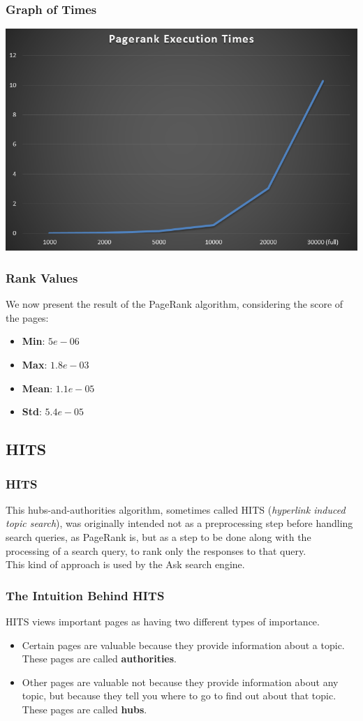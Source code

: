 \documentclass{beamer}
\begin{document}
\begin{frame}
\frametitle{Graph of Times}
\includegraphics[scale=0.5]{img/Ranking/Pagerank.PNG} 
\end{frame}

\begin{frame}
\frametitle{Rank Values}
We now present the result of the PageRank algorithm, considering the score of the pages:\\
\begin{itemize}
\item \textbf{Min}: $5e-06$
\item \textbf{Max}: $1.8e-03$
\item \textbf{Mean}: $1.1e-05$
\item \textbf{Std}: $5.4e-05$
\end{itemize}
\end{frame}

\subsection{HITS}
\begin{frame}
\frametitle{HITS}
This hubs-and-authorities algorithm, sometimes called HITS (\textit{hyperlink induced
topic search}), was originally intended not as a preprocessing step before
handling search queries, as PageRank is, but as a step to be done along with
the processing of a search query, to rank only the responses to that query.\\
\medskip
This kind of approach is  used by the Ask search engine.
\end{frame}

\begin{frame}
\frametitle{The Intuition Behind HITS}
HITS views important pages as having two different types of importance.
\begin{itemize}
\item Certain pages are valuable because they provide information about a
topic. These pages are called \textbf{authorities}.
\item Other pages are valuable not because they provide information about any
topic, but because they tell you where to go to find out about that topic.
These pages are called \textbf{hubs}.
\end{itemize}
\end{frame}
\end{document}

